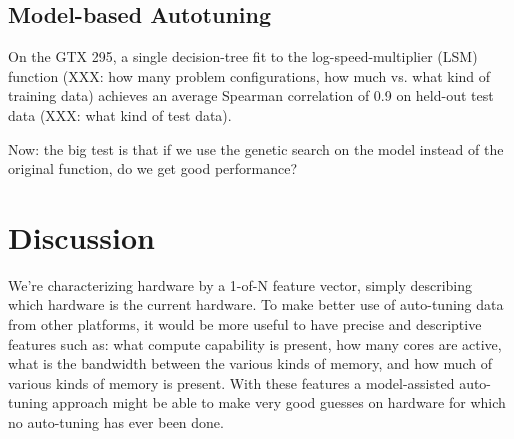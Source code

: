 \documentclass{sig-alternate}
\begin{document}
\subsection{Model-based Autotuning}

On the GTX 295, a single decision-tree fit to the log-speed-multiplier
(LSM) function (XXX: how many problem configurations, how much vs. what
kind of training data) achieves an average Spearman correlation of 0.9 on
held-out test data (XXX: what kind of test data).

Now: the big test is that if we use the genetic search on the model instead of
the original function, do we get good performance?

\section{Discussion}

We're characterizing hardware by a 1-of-N feature vector, simply describing
which hardware is the current hardware.
To make better use of auto-tuning data from other platforms, it would be more
useful to have precise and descriptive features such as: what compute
capability is present, how many cores are active, what is the bandwidth
between the various kinds of memory, and how much of various kinds of memory
is present.  With these features a model-assisted auto-tuning approach
might be able to make very good guesses on hardware for which no auto-tuning
has ever been done.
\end{document}
